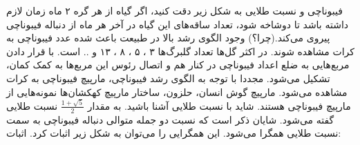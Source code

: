 \begin{EXTRA}{فیبوناچی و نسبت طلایی }
    \p
    به شکل زیر دقت کنید، اگر گیاه از هر گره ۲ ماه زمان لازم داشته باشد تا دوشاخه شود، تعداد ساقه‌های این گیاه در آخر هر ماه از دنباله فیبوناچی پیروی می‌کند.(چرا؟)
    \p
    وجود الگوی رشد بالا در طبیعت باعث شده عدد فیبوناچی به کرات مشاهده شوند.
    در اکثر گل‌ها تعداد گلبرگ‌ها ۳ ، ۵ ، ۸ ، ۱۳ و .. است.
    \p
    با قرار دادن مربع‌هایی به ضلع اعداد فیبوناچی در کنار هم و اتصال رئوس این مربع‌ها به کمک کمان، تشکیل می‌شود.
    \p
    مجددا با توجه به الگوی رشد فیبوناچی، مارپیچ فیبوناچی به کرات مشاهده می‌شود.
    مارپیچ گوش انسان، حلزون، ساختار مارپیچ کهکشان‌ها نمونه‌هایی از مارپیچ فیبوناچی هستند.
    \p
    شاید با نسبت طلایی آشنا باشید. به مقدار $\frac{1+\sqrt{5}}{2}$ نسبت طلایی گفته می‌شود.
    شایان ذکر است که نسبت دو جمله متوالی دنباله فیبوناچی به سمت نسبت طلایی همگرا می‌شود.
    این همگرایی را می‌توان به شکل زیر اثبات کرد.
    اثبات:


\end{EXTRA}
